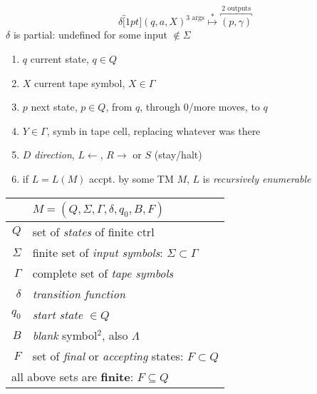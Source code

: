{\footnotesize
\begin{minipage}[]{0.45\linewidth}
  \[\delta\overbracket[1pt]{(q,a,X)}^\text{3 args} \overset{*}{\mapsto} \overbracket{(p,\gamma)}^\text{2 outputs} \]
  $\delta$ is partial: undefined for some input \(\notin \Sigma\)
\begin{enumerate}
    \item \(q\) current state, \(q \in Q\)
    \item \(X\) current tape symbol, \(X \in \Gamma\)
    \item \(p\) next state, \(p \in Q\), from \(q\), through 0/more moves, to \(q\)
    \item \(Y \in \Gamma\), symb in tape cell, replacing whatever was there
    \item \(D\) \emph{direction}, \(L \leftarrow\), \(R \rightarrow\) or \(S\) (stay/halt)
    \item if \(L = L(M)\) accpt. by some TM \(M\), \(L\) is \emph{recursively enumerable}
\end{enumerate}
\end{minipage}
\begin{minipage}{0.5\linewidth}
  \centering
  \begin{tabular}{r|p{3.8cm}}
    & $ M = (Q,\Sigma,\Gamma,\delta,q_{0},B,F)$  \\
    \hline
    $Q$ & set of \emph{states} of finite ctrl\\
    $\Sigma$ & finite set of \emph{input symbols}: \(\Sigma \subset \Gamma\)\\
    $\Gamma$ & complete set of \emph{tape symbols}\\
    $\delta$ & \emph{transition function}\\
    $q_{0}$  &  \emph{start state} \(\in Q\)\\
    $B$     & \emph{blank} symbol$^{2}$, also \(\Lambda\)\\
    $F$      & set of \emph{final} or \emph{accepting} states: \(F \subset Q\)\\
    \hline
    \multicolumn{2}{l}{all above sets are \textbf{finite}: \(F \subseteq Q\) }\\
    \hline
\end{tabular}\\
\end{minipage}
}
